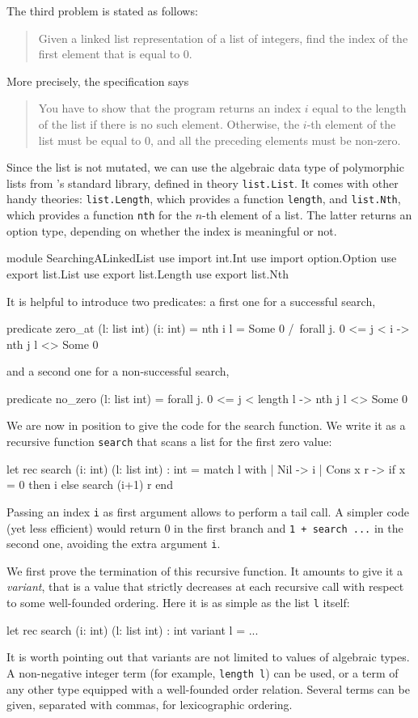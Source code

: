 The third problem is stated as follows:
\begin{quote}
  Given a linked list representation of a list of integers,
  find the index of the first element that is equal to 0.
\end{quote}
More precisely, the specification says
\begin{quote}
  You have to show that the program returns an index $i$ equal to the
  length of the list if there is no such element. Otherwise, the $i$-th
  element of the list must be equal to 0, and all the preceding
  elements must be non-zero.
\end{quote}
Since the list is not mutated, we can use the algebraic data type of
polymorphic lists from \why's standard library, defined in theory
\texttt{list.List}. It comes with other handy theories:
\texttt{list.Length}, which provides a function \texttt{length}, and
\texttt{list.Nth}, which provides a function \texttt{nth}
for the $n$-th element of a list. The latter returns an option type,
depending on whether the index is meaningful or not.
\begin{whycode}
module SearchingALinkedList
  use import int.Int
  use import option.Option
  use export list.List
  use export list.Length
  use export list.Nth
\end{whycode}
It is helpful to introduce two predicates: a first one
for a successful search,
\begin{whycode}
  predicate zero_at (l: list int) (i: int) =
    nth i l = Some 0 /\ forall j. 0 <= j < i -> nth j l <> Some 0
\end{whycode}
and a second one for a non-successful search,
\begin{whycode}
  predicate no_zero (l: list int) =
    forall j. 0 <= j < length l -> nth j l <> Some 0
\end{whycode}
We are now in position to give the code for the search function.
We write it as a recursive function \texttt{search} that scans a list
for the first zero value:
\begin{whycode}
  let rec search (i: int) (l: list int) : int =
    match l with
    | Nil      -> i
    | Cons x r -> if x = 0 then i else search (i+1) r
    end
\end{whycode}
Passing an index \texttt{i} as first argument allows to perform a tail
call. A simpler code (yet less efficient) would return 0 in the first
branch and \texttt{1 + search ...} in the second one, avoiding the
extra argument \texttt{i}.

We first prove the termination of this recursive function. It amounts
to give it a \emph{variant}, that is a value that strictly decreases
at each recursive call with respect to some well-founded ordering.
Here it is as simple as the list \texttt{l} itself:
\begin{whycode}
  let rec search (i: int) (l: list int) : int variant { l } = ...
\end{whycode}
It is worth pointing out that variants are not limited to values
of algebraic types. A non-negative integer term (for example,
\texttt{length l}) can be used, or a term of any other type
equipped with a well-founded order relation.
Several terms can be given, separated with commas,
for lexicographic ordering.

